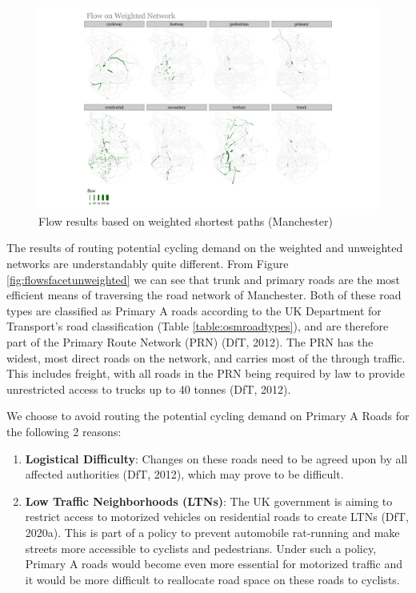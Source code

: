 \documentclass[
]{article}
\providecommand{\tightlist}{%
  \setlength{\itemsep}{0pt}\setlength{\parskip}{0pt}}
\begin{document}
\begin{figure}
\includegraphics[width=0.9\linewidth]{data/Manchester/Plots/flows_facet_weighted_Manchester} \caption{Flow results based on weighted shortest paths (Manchester)}\label{fig:flowsfacetweighted}
\end{figure}

The results of routing potential cycling demand on the weighted and
unweighted networks are understandably quite different. From Figure
\ref{fig:flowsfacetunweighted} we can see that trunk and primary roads
are the most efficient means of traversing the road network of
Manchester. Both of these road types are classified as Primary A roads
according to the UK Department for Transport's road classification
(Table \ref{table:osmroadtypes}), and are therefore part of the Primary
Route Network (PRN) (DfT, 2012). The PRN has the widest,
most direct roads on the network, and carries most of the through
traffic. This includes freight, with all roads in the PRN being required
by law to provide unrestricted access to trucks up to 40 tonnes
(DfT, 2012).

We choose to avoid routing the potential cycling demand on Primary A
Roads for the following 2 reasons:

\begin{enumerate}
\def\labelenumi{\arabic{enumi}.}
\tightlist
\item
  \textbf{Logistical Difficulty}: Changes on these roads need to be agreed
  upon by all affected authorities (DfT, 2012), which
  may prove to be difficult.
\item
  \textbf{Low Traffic Neighborhoods (LTNs)}: The UK government is aiming to
  restrict access to motorized vehicles on residential roads to create
  LTNs (DfT, 2020a). This is part of a policy to
  prevent automobile rat-running and make streets more accessible to
  cyclists and pedestrians. Under such a policy, Primary A roads would
  become even more essential for motorized traffic and it would be
  more difficult to reallocate road space on these roads to cyclists.
\end{enumerate}
\end{document}
